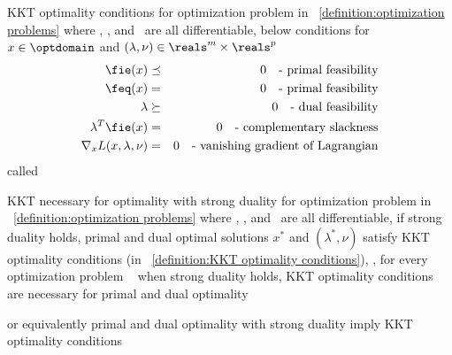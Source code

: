 \documentclass[17pt,landscape]{foils}
\begin{document}
{\begin{mydefinition}{KKT optimality conditions}
	for optimization problem in ~\ref{definition:optimization problems}
	where \fobj, \fie, and \feq\ are all differentiable,
	below conditions
	for ${x}\in\optdomain$ and $({\lambda}, {\nu})\in\reals^m\times\reals^p$
	\begin{eqnarray*}
		\fie({x})
			&\preceq&
		0
		\quad
		\mbox{- primal feasibility}
		\\
		\feq(x)
			&=&
		0
		\quad
		\mbox{- primal feasibility}
		\\
		\lambda
			&\succeq&
		0
		\quad
		\mbox{- dual feasibility}
		\\
		{\lambda}^T \fie({x})
			&=&
		0
		\quad
		\mbox{- complementary slackness}
		\\
		\nabla_x L(x,\lambda,\nu)
			&=&
		0
		\quad
		\mbox{- vanishing gradient of Lagrangian}
	\end{eqnarray*}
	called 
\end{mydefinition}



\begin{mytheorem}{KKT necessary for optimality with strong duality}
	for optimization problem in ~\ref{definition:optimization problems}
	where \fobj, \fie, and \feq\ are all differentiable,
	if strong duality holds,
	primal and dual optimal solutions $x^\ast$ and $(\lambda^\ast, \nu)$
	satisfy KKT optimality conditions (in ~\ref{definition:KKT optimality conditions}),
	\ie,
	for every optimization problem
	\shrinkspacewithintheoremslike\
	\ibit
	\iitem
		when strong duality holds,
		KKT optimality conditions are necessary for primal and dual optimality
	\item []
		or equivalently
	\iitem
		primal and dual optimality with strong duality imply KKT optimality conditions
	\eit
\end{mytheorem}



}
\end{document}
